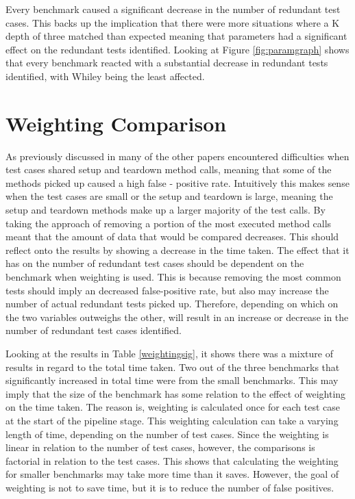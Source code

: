Every benchmark caused a significant decrease in the number of redundant test cases. This backs up the implication that there were more situations where a K depth of three matched than expected meaning that parameters had a significant effect on the redundant tests identified. Looking at Figure \ref{fig:paramgraph} shows that every benchmark reacted with a substantial decrease in redundant tests identified, with Whiley being the least affected. 


\section{Weighting Comparison}
\label{sec:weight}
As previously discussed in  many of the other papers encountered difficulties when test cases shared setup and teardown method calls, meaning that some of the methods picked up caused a high false - positive rate. Intuitively this makes sense when the test cases are small or the setup and teardown is large, meaning the setup and teardown methods make up a larger majority of the test calls. By taking the approach of removing a portion of the most executed method calls meant that the amount of data that would be compared decreases. This should reflect onto the results by showing a decrease in the time taken. The effect that it has on the number of redundant test cases should be dependent on the benchmark when weighting is used. This is because removing the most common tests should imply an decreased false-positive rate, but also may increase the number of actual redundant tests picked up. Therefore, depending on which on the two variables outweighs the other, will result in an increase or decrease in the number of redundant test cases identified.

Looking at the results in Table \ref{weightingsig}, it shows there was a mixture of results in regard to the total time taken. Two out of the three benchmarks that significantly increased in total time were from the small benchmarks. This may imply that the size of the benchmark has some relation to the effect of weighting on the time taken. The reason is, weighting is calculated once for each test case at the start of the pipeline stage. This weighting calculation can take a varying length of time, depending on the number of test cases. Since the weighting is linear in relation to the number of test cases, however, the comparisons is factorial in relation to the test cases. This shows that calculating the weighting for smaller benchmarks may take more time than it saves. However, the goal of weighting is not to save time, but it is to reduce the number of false positives.


